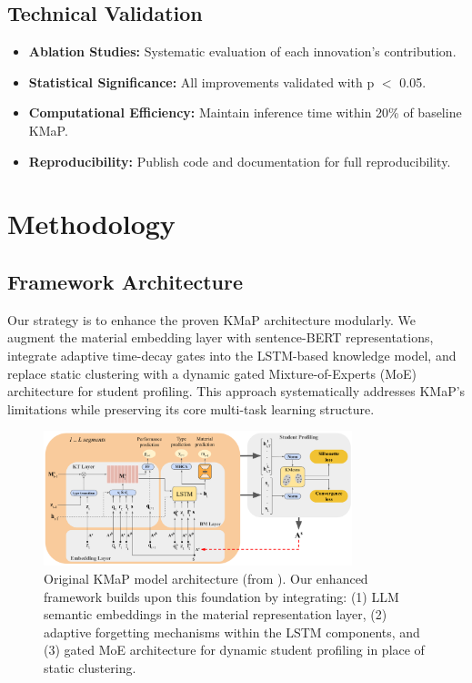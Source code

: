 \documentclass[project-plan]{report-template}
\begin{document}
\subsection{Technical Validation}
\begin{itemize}
    \item \textbf{Ablation Studies:} Systematic evaluation of each innovation's contribution.
    \item \textbf{Statistical Significance:} All improvements validated with p $<$ 0.05.
    \item \textbf{Computational Efficiency:} Maintain inference time within 20\% of baseline KMaP.
    \item \textbf{Reproducibility:} Publish code and documentation for full reproducibility.
\end{itemize}

\section{Methodology}

\subsection{Framework Architecture}
Our strategy is to enhance the proven KMaP architecture modularly. We augment the material embedding layer with sentence-BERT representations, integrate adaptive time-decay gates into the LSTM-based knowledge model, and replace static clustering with a dynamic gated Mixture-of-Experts (MoE) architecture for student profiling. This approach systematically addresses KMaP's limitations while preserving its core multi-task learning structure.

\begin{figure}[ht]
    \centering
    \includegraphics[width=0.8\textwidth]{The proposed model architecture for KMaP.png}
    \caption{Original KMaP model architecture (from \cite{hashemifar2025personalized}). Our enhanced framework builds upon this foundation by integrating: (1) LLM semantic embeddings in the material representation layer, (2) adaptive forgetting mechanisms within the LSTM components, and (3) gated MoE architecture for dynamic student profiling in place of static clustering.}
    \label{fig:architecture}
\end{figure}
\end{document}
